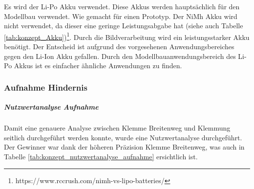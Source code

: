 \documentclass[../main.tex]{subfiles}
\begin{document}
Es wird der Li-Po Akku verwendet. Diese Akkus werden hauptsächlich für den Modellbau verwendet. Wie gemacht für einen Prototyp. Der NiMh Akku wird nicht verwendet, da dieser eine geringe Leistungsabgabe hat (siehe auch Tabelle \ref{tab:konzept_Akku})\footnote{https://www.rccrush.com/nimh-vs-lipo-batteries/}. Durch die Bildverarbeitung wird ein leistungsstarker Akku benötigt. Der Entscheid ist aufgrund des vorgesehenen Anwendungsbereiches gegen den Li-Ion Akku gefallen. Durch den Modellbauanwendungsbereich des Li-Po Akkus ist es einfacher ähnliche Anwendungen zu finden.


\newpage
\subsubsection{Aufnahme Hindernis}
\subparagraph{Nutzwertanalyse Aufnahme}
        Damit eine genauere Analyse zwischen Klemme Breitenweg und Klemmung seitlich durchgeführt werden konnte, wurde eine Nutzwertanalyse durchgeführt. Der Gewinner war dank der höheren Präzision Klemme Breitenweg, was auch in Tabelle \ref{tab:konzept_nutzwertanalyse_aufnahme} ersichtlich ist.
        
        \begin{table}[H]
            \caption{Nutzwertanalyse Hindernis Aufnahme}
            \label{tab:konzept_nutzwertanalyse_aufnahme}
        \end{table}
\end{document}
